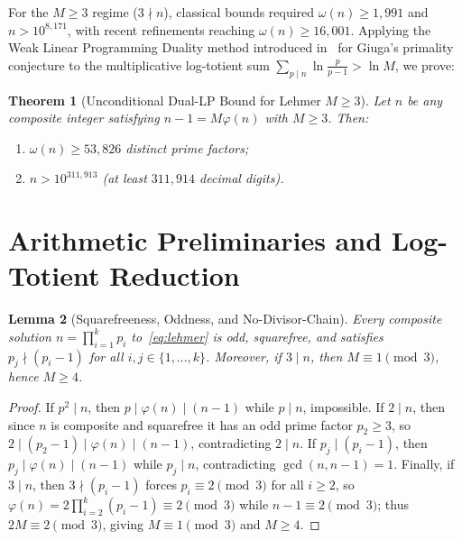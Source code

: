 \documentclass[11pt]{amsart}
\newtheorem{theorem}{Theorem}[section]
\newtheorem{lemma}[theorem]{Lemma}
\theoremstyle{remark}
\numberwithin{equation}{section}
\begin{document}
For the $M \ge 3$ regime ($3 \nmid n$), classical bounds required $\omega(n) \ge 1{,}991$ and $n > 10^{8{,}171}$, with recent refinements reaching $\omega(n) \ge 16{,}001$. Applying the Weak Linear Programming Duality method introduced in~\cite{BarmaseNeon2026} for Giuga's primality conjecture to the multiplicative log-totient sum $\sum_{p \mid n} \ln\frac{p}{p-1} > \ln M$, we prove:

\begin{theorem}[Unconditional Dual-LP Bound for Lehmer $M \ge 3$]\label{thm:main}
Let $n$ be any composite integer satisfying $n - 1 = M\varphi(n)$ with $M \ge 3$. Then:
\begin{enumerate}
    \item $\omega(n) \ge 53{,}826$ distinct prime factors;
    \item $n > 10^{311{,}913}$ (at least $311{,}914$ decimal digits).
\end{enumerate}
\end{theorem}

\section{Arithmetic Preliminaries and Log-Totient Reduction}

\begin{lemma}[Squarefreeness, Oddness, and No-Divisor-Chain]\label{lem:basic}
Every composite solution $n = \prod_{i=1}^k p_i$ to~\eqref{eq:lehmer} is odd, squarefree, and satisfies $p_j \nmid (p_i - 1)$ for all $i, j \in \{1,\dots,k\}$. Moreover, if $3 \mid n$, then $M \equiv 1 \pmod 3$, hence $M \ge 4$.
\end{lemma}

\begin{proof}
If $p^2 \mid n$, then $p \mid \varphi(n) \mid (n - 1)$ while $p \mid n$, impossible. If $2 \mid n$, then since $n$ is composite and squarefree it has an odd prime factor $p_2 \ge 3$, so $2 \mid (p_2 - 1) \mid \varphi(n) \mid (n - 1)$, contradicting $2 \mid n$. If $p_j \mid (p_i - 1)$, then $p_j \mid \varphi(n) \mid (n - 1)$ while $p_j \mid n$, contradicting $\gcd(n, n-1) = 1$. Finally, if $3 \mid n$, then $3 \nmid (p_i - 1)$ forces $p_i \equiv 2 \pmod 3$ for all $i \ge 2$, so $\varphi(n) = 2\prod_{i=2}^k (p_i - 1) \equiv 2 \pmod 3$ while $n - 1 \equiv 2 \pmod 3$; thus $2M \equiv 2 \pmod 3$, giving $M \equiv 1 \pmod 3$ and $M \ge 4$.
\end{proof}
\end{document}
